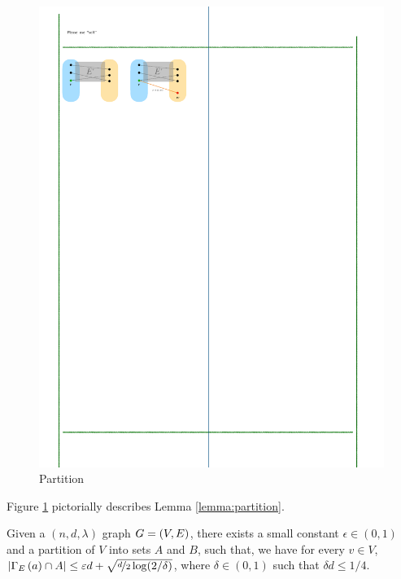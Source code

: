 \documentclass[11pt]{article}
\newcommand{\EnDeeLambda}{(n, d, \lambda)}
\newcommand{\EdgesShort}{E}
\begin{document}
\begin{figure}
	\includegraphics{assets/non-blocking-networks.pdf}
	\caption{Partition }
	\label{fig:partition}
\end{figure}

Figure \ref{fig:partition} pictorially describes Lemma \ref{lemma:partition}.

\begin{lemma}\label{lemma:partition}Given a $\EnDeeLambda$ graph $G = (V, E)$, there exists a small constant $\epsilon \in (0,1)$ and a partition of $V$ into sets $A$ and $B$, such that, we have for every $v \in V$, $|\Neighbourhood{\EdgesShort}{a} \cap A| \leq \epsilon d + \sqrt{\nicefrac{d}{2}\log (2/\delta)}$,
where $\delta \in (0,1)$ such that $\delta d \leq 1/4$.	
\end{lemma}
\end{document}
